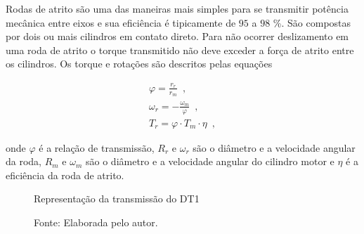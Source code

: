 Rodas de atrito são uma das maneiras mais simples para se transmitir potência mecânica entre eixos e sua eficiência é tipicamente de $95$ a $98$ {\%}. São compostas por dois ou mais cilindros em contato direto.  
Para não ocorrer deslizamento em uma roda de atrito o torque transmitido não deve exceder a força de atrito entre os cilindros. Os torque e rotações são descritos pelas equações 

\begin{subequations}
	\label{eq:Transmissao}
	\begin{align}
		\varphi = \frac{r_{r}}{r_{m}}\enspace, \label{eq:Transmissao_1} \\
		\omega_{r} = -\frac{\omega_{m}}{\varphi}\enspace, \label{eq:Transmissao_2}  \\
		T_{r} =\varphi \cdot T_{m} \cdot \eta\enspace, \label{eq:Transmissao_3}
	\end{align}
\end{subequations}

onde $\varphi$ é a relação de transmissão, $R_{r}$ e $\omega_{r}$ são o diâmetro e a velocidade angular da roda, 
$R_{m}$ e $\omega_{m}$ são o diâmetro e a velocidade angular do cilindro motor e $\eta$ é a eficiência da roda de atrito.\cite{book:Niemann1971,book:Norton2010}

\begin{figure}[h]
	\centering
	\caption{Representação da transmissão do DT1}
	\label{dig:Trasmissao}
	\caption*{\footnotesize Fonte: Elaborada pelo autor.}
\end{figure}

